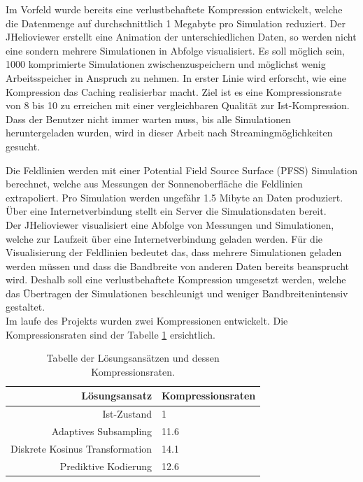 Im Vorfeld wurde bereits eine verlustbehaftete Kompression entwickelt, welche die Datenmenge auf durchschnittlich 1 Megabyte pro Simulation reduziert. Der JHelioviewer erstellt eine Animation der unterschiedlichen Daten, so werden nicht eine sondern mehrere Simulationen in Abfolge visualisiert. Es soll möglich sein, 1000 komprimierte Simulationen zwischenzuspeichern und möglichst wenig Arbeitsspeicher in Anspruch zu nehmen. In erster Linie wird erforscht, wie eine Kompression das Caching realisierbar macht. Ziel ist es eine Kompressionsrate von 8 bis 10 zu erreichen mit einer vergleichbaren Qualität zur Ist-Kompression.\\
Dass der Benutzer nicht immer warten muss, bis alle Simulationen heruntergeladen wurden, wird in dieser Arbeit nach Streamingmöglichkeiten gesucht.

Die Feldlinien werden mit einer Potential Field Source Surface (PFSS) Simulation berechnet, welche aus Messungen der Sonnenoberfläche die Feldlinien extrapoliert. Pro Simulation werden ungefähr 1.5 Mibyte an Daten produziert. Über eine Internetverbindung stellt ein Server die Simulationsdaten bereit.\\
Der JHelioviewer visualisiert eine Abfolge von Messungen und Simulationen, welche zur Laufzeit über eine Internetverbindung geladen werden. Für die Visualisierung der Feldlinien bedeutet das, dass mehrere Simulationen geladen werden müssen und dass die Bandbreite von anderen Daten bereits beansprucht wird. Deshalb soll eine verlustbehaftete Kompression umgesetzt werden, welche das Übertragen der Simulationen beschleunigt und weniger Bandbreitenintensiv gestaltet.\\
[\baselineskip]
Im laufe des Projekts wurden zwei Kompressionen entwickelt. Die Kompressionsraten sind der Tabelle \ref{einleitung:tabelle} ersichtlich.
\begin{table}[!htbp]
	\center
	\begin{tabular}{r|l}
		Lösungsansatz & Kompressionsraten \\\hline
		Ist-Zustand & 1\\
		Adaptives Subsampling & 11.6 \\
		Diskrete Kosinus Transformation & 14.1 \\
		Prediktive Kodierung & 12.6\\
	\end{tabular}
	\caption{Tabelle der Lösungsansätzen und dessen Kompressionsraten.}
	\label{einleitung:tabelle}
\end{table}
